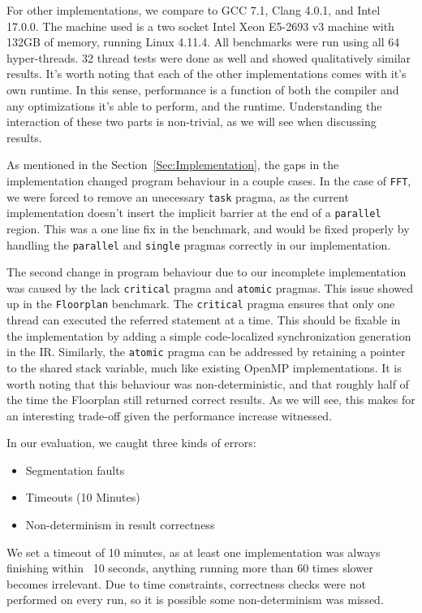 \documentclass[sigconf]{acmart}
\begin{document}
For other implementations, we compare to GCC 7.1, Clang 4.0.1, and Intel
17.0.0. The machine used is a two socket Intel Xeon E5-2693 v3 machine with
132GB of memory, running Linux 4.11.4. All benchmarks were run using all 64
hyper-threads. 32 thread tests were done as well and showed qualitatively
similar results. It's worth noting that each of the other implementations comes
with it's own runtime. In this sense, performance is a function of both the
compiler and any optimizations it's able to perform, and the runtime.
Understanding the interaction of these two parts is non-trivial, as we will see
when discussing results. 

As mentioned in the Section~\ref{Sec:Implementation}, the gaps in the implementation
changed program behaviour in a couple cases. In the case of \texttt{FFT}, we were
forced to remove an unecessary \texttt{task} pragma, as the current implementation
doesn't insert the implicit barrier at the end of a \texttt{parallel} region. This 
was a one line fix in the benchmark, and would be fixed properly by handling
the \texttt{parallel} and \texttt{single} pragmas correctly in our implementation. 

The second change in program behaviour due to our incomplete implementation was
caused by the lack \texttt{critical} pragma and \texttt{atomic} pragmas. This
issue showed up in the \texttt{Floorplan} benchmark. The \texttt{critical} pragma
ensures that only one thread can executed the referred statement at a time. 
This should be fixable in the implementation by adding a simple code-localized
synchronization generation in the IR. Similarly, the \texttt{atomic} pragma 
can be addressed by retaining a pointer to the shared stack variable, much like
existing OpenMP implementations. It is worth noting that this behaviour was
non-deterministic, and that roughly half of the time the Floorplan still
returned correct results. As we will see, this makes for an interesting
trade-off given the performance increase witnessed.

In our evaluation, we caught three kinds of errors:

\begin{itemize}
\item Segmentation faults
\item Timeouts (10 Minutes)
\item Non-determinism in result correctness
\end{itemize}

We set a timeout of 10 minutes, as at least one implementation was always
finishing within ~10 seconds, anything running more than 60 times slower
becomes irrelevant. Due to time constraints, correctness checks were not
performed on every run, so it is possible some non-determinism was missed. 
\end{document}
